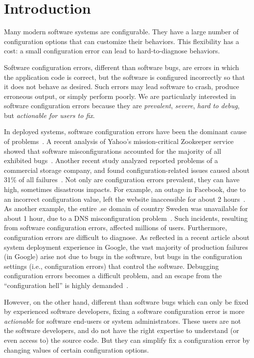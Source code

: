 \section{Introduction}
\label{sec:introduction}

Many modern software systems are configurable. They
have a large number of configuration options that can
customize their behaviors. This flexibility has a cost:
a small configuration error can lead to hard-to-diagnose
behaviors.

Software configuration errors, different than
software bugs, are errors in which
the application code is correct, but the software is
configured incorrectly so that it does not behave
as desired. Such errors may lead software to crash,
produce erroneous output, or simply perform poorly.
We are particularly interested in software configuration
errors because they are \textit{prevalent}, \textit{severe},
\textit{hard to debug}, but \textit{actionable for users
to fix}.


In deployed systems, software configuration errors have been
the dominant cause of problems~\cite{}.
A recent analysis of Yahoo's mission-critical Zookeeper service
showed that software misconfigurations accounted for
the majority of all exhibited bugs~\cite{bft}. Another
recent study analyzed reported problems of a commercial
storage company, and found configuration-related issues
caused about 31\% of all failures~\cite{Yin:2011:ESC}.
Not only are configuration errors prevalent, they
can have high, sometimes disastrous impacts. For example,
an outage in Facebook, due to
an incorrect configuration value, left the website 
inaccessible for about 2 hours~\cite{fbout}. As another example,
the entire .se domain of country Sweden was unavailable
for about 1 hour, due to a DNS misconfiguration problem~\cite{sedown}.
Such incidents, resulting from software configuration errors,
affected millions of users. Furthermore, configuration
errors are difficult to diagnose.
As reflected in a recent article about system deployment experience
in Google, the vast majority of production failures (in Google)
arise not due to bugs in the software, but bugs in the
configuration settings (i.e., configuration errors)
that control the software. Debugging
configuration errors becomes a difficult problem, and an escape
from the ``configuration hell'' is highly demanded~\cite{googleconf}.

However, on the other hand, different than software bugs
which can only be fixed by experienced software developers, fixing a software
configuration error is more \textit{actionable} for software end-users
or system administrators. These users are not the software developers,
and do not have the right expertise to understand (or even access to)
the source code.  But they can simplify fix a configuration error by changing
values of certain configuration options.



